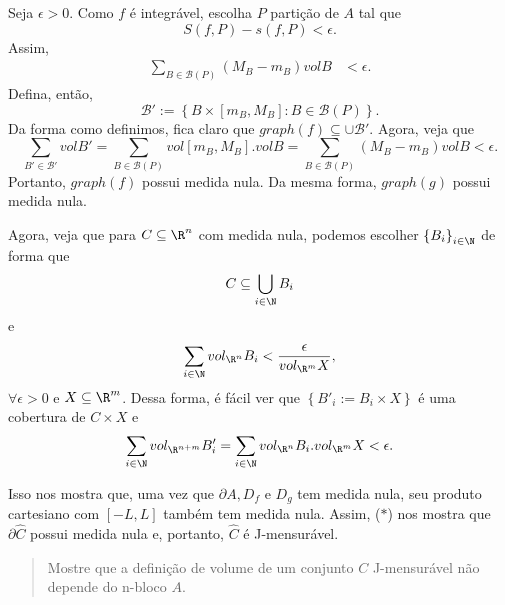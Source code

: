 \documentclass[a4paper]{report}
\begin{document}
Seja $\epsilon>0$. Como $f$ é integrável, escolha $P$ partição de $A$ tal que \[
S\left( f,P \right) - s\left( f,P \right) < \epsilon
.\] Assim, 
\begin{align*}
    \sum_{B\in \mathcal{B}\left( P \right) } \left( M_B - m_B \right) vol B & <\epsilon
.\end{align*}
Defina, então, \[
\mathcal{B}' := \left\{ B \times \left[ m_{B}, M_{B} \right] : B\in \mathcal{B}\left( P \right)  \right\} 
.\] Da forma como definimos, fica claro que $graph\left( f \right) \subseteq \cup \mathcal{B}'$. Agora, veja que \[
\sum_{B'\in \mathcal{B}'} vol B' = \sum_{B\in \mathcal{B}\left( P \right) } vol \left[ m_B,M_B \right] . vol B = \sum_{B\in \mathcal{B}\left( P \right) } \left( M_B-m_B \right)  vol B < \epsilon
.\] Portanto, $graph\left( f \right) $ possui medida nula. Da mesma forma, $graph\left( g\right) $ possui medida nula.

Agora, veja que para $C\subseteq\R^{n}$ com medida nula, podemos escolher $\left\{ B_i \right\} _{i\in \N}$ de forma que \[
C \subseteq \bigcup_{i\in \N} B_i
\] e \[
\sum_{i\in \N} vol_{\R^{n}} B_i < \frac{\epsilon}{vol_{\R^{m}} X}
,\] $\forall \epsilon> 0$ e $X\subseteq\R^{m}$. Dessa forma, é fácil ver que $\left\{ B'_i := B_i \times X \right\} $ é uma cobertura de $C\times X$ e \[
\sum_{i\in \N} vol_{\R^{n+m}} B_i' = \sum_{i\in \N} vol_{\R^{n}}B_i . vol_{\R^{m}} X < \epsilon
.\] 

Isso nos mostra que, uma vez que $\partial A, D_f$ e $D_g$ tem medida nula, seu produto cartesiano com $\left[ -L, L \right] $ também tem medida nula. Assim, ($*$) nos mostra que $\partial \hat{C}$ possui medida nula e, portanto, $\hat{C}$ é J-mensurável.


\begin{quote}
    Mostre que a definição de volume de um conjunto $C$ J-mensurável não depende do n-bloco $A$.
\end{quote}
\end{document}
